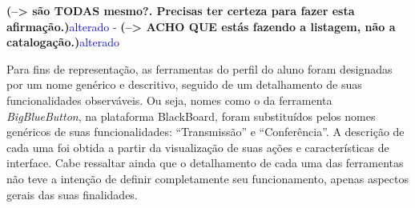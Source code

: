 \textbf{ (--> são TODAS mesmo?. Precisas ter certeza para fazer esta afirmação.)}\textcolor{blue} {alterado} - \textbf{(--> ACHO QUE estás fazendo a listagem, não a catalogação.)}\textcolor{blue} {alterado}

Para fins de representação, as ferramentas do perfil do aluno foram designadas por um nome genérico e descritivo, seguido de um detalhamento de suas funcionalidades observáveis. Ou seja, nomes como o da ferramenta \emph{BigBlueButton}, na plataforma BlackBoard, foram substituídos pelos nomes genéricos de suas funcionalidades: ``Transmissão'' e ``Conferência''. A descrição de cada uma foi obtida a partir da visualização de suas ações e características de interface. Cabe ressaltar ainda que o detalhamento de cada uma das ferramentas não teve a intenção de definir completamente seu funcionamento, apenas aspectos gerais das suas finalidades.

